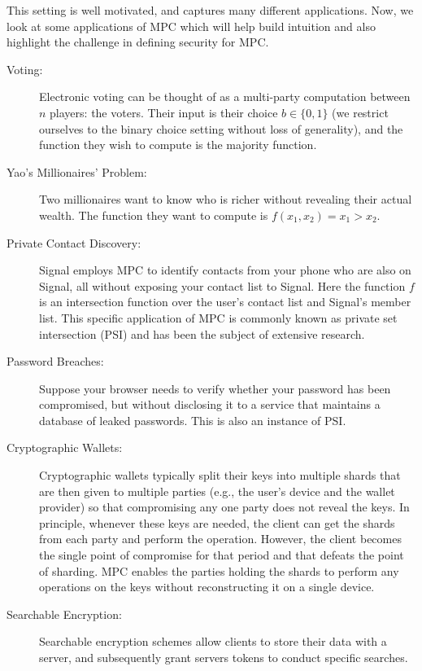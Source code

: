 This setting is well motivated, and captures many different applications.
Now, we look at some applications of MPC which will help build intuition and also highlight the challenge in defining security for MPC.
\begin{description}
  \item[Voting:] Electronic voting can be thought of as a multi-party computation
	  between $n$ players: the voters. Their input is their choice $b \in \{0,1\}$
    (we restrict ourselves to the binary choice setting without loss of generality), and the function
    they wish to compute is the majority function.

  \item[Yao's Millionaires' Problem:] Two millionaires want to know who is richer
    without revealing their actual wealth. The function they want to compute is
    $f(x_1, x_2) = x_1 > x_2$.
  
  \item[Private Contact Discovery:] Signal employs MPC to identify contacts from your phone who are also on Signal, all without exposing your contact list to Signal.
  Here the function $f$ is an intersection function over the user's contact list and Signal's member list. This specific application of MPC is commonly known as private set intersection (PSI) and has been the subject of extensive research.

  \item[Password Breaches:] Suppose your browser needs to verify whether your password has been compromised, but without disclosing it to a service that maintains a database of leaked passwords. This is also an instance of PSI.

  \item[Cryptographic Wallets:] Cryptographic wallets typically split their keys into multiple shards that are then given to multiple parties (e.g., the user's device and the wallet provider) so that compromising any one party does not reveal the keys. In principle, whenever these keys are needed, the client can get the shards from each party and perform the operation. However, the client becomes the single point of compromise for that period and that defeats the point of sharding. MPC enables the parties holding the shards to perform any operations on the keys without reconstructing it on a single device.

  \item[Searchable Encryption:] Searchable encryption schemes allow clients
    to store their data with a server, and subsequently grant servers tokens
    to conduct specific searches.
\end{description}

